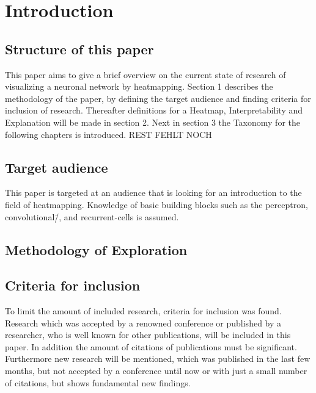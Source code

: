 \section{Introduction}
\blindtext[3]

\subsection{Structure of this paper}
This paper aims to give a brief overview on the current state of research of visualizing a neuronal network by heatmapping. Section 1 describes the methodology of the paper, by defining the target audience and finding criteria for inclusion of research.
Thereafter definitions for a Heatmap, Interpretability and Explanation will be made in section 2. Next in section 3 the Taxonomy for the following chapters is introduced. REST FEHLT NOCH


\subsection{Target audience}
This paper is targeted at an audience that is looking for an introduction to 
the field of heatmapping. Knowledge of basic building blocks such as the 
perceptron, convolutional\=/, and recurrent-cells is assumed.

\subsection{Methodology of Exploration}
\blindtext[3]

\subsection{Criteria for inclusion}
To limit the amount of included research, criteria for inclusion was found. Research which was accepted by a renowned conference or published by a researcher, who is well known for other publications, will be included in this paper. In addition the amount of citations of publications must be significant. Furthermore new research will be mentioned, which was published in the last few months, but not accepted by a conference until now or with just a small number of citations, but shows fundamental new findings.